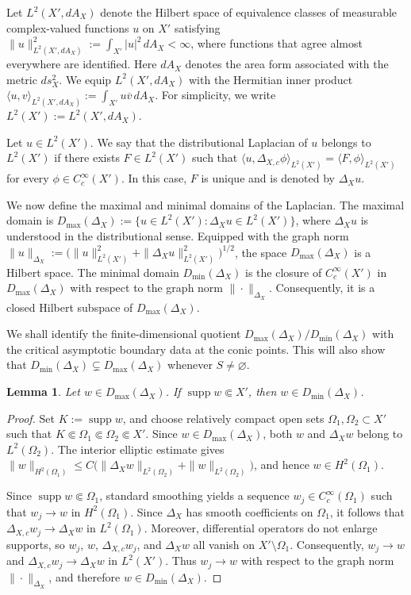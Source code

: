 \documentclass[12pt]{amsart}
\theoremstyle{plain}
\newtheorem{lem}[thm]{Lemma}
\theoremstyle{definition}
\theoremstyle{remark}
\numberwithin{equation}{section} \numberwithin{figure}{section}
\renewcommand*{\to}{\rightarrow}
\begin{document}
Let \(L^2(X',dA_X)\) denote the Hilbert space of equivalence classes of
measurable complex-valued functions \(u\) on \(X'\) satisfying
\(\|u\|_{L^2(X',dA_X)}^2:=\int_{X'}|u|^2\,dA_X<\infty\), where functions
that agree almost everywhere are identified. Here \(dA_X\) denotes the
area form associated with the metric \(ds_X^2\). We equip
\(L^2(X',dA_X)\) with the Hermitian inner product
\(\langle u,v\rangle_{L^2(X',dA_X)}
:=\int_{X'}u\overline{v}\,dA_X\). For simplicity, we write
\(L^2(X'):=L^2(X',dA_X)\).

Let \(u\in L^2(X')\). We say that the distributional Laplacian of \(u\)
belongs to \(L^2(X')\) if there exists \(F\in L^2(X')\) such that
\(\langle u,\Delta_{X,c}\phi\rangle_{L^2(X')}
=\langle F,\phi\rangle_{L^2(X')}\) for every
\(\phi\in C_c^\infty(X')\). In this case, \(F\) is unique and is denoted
by \(\Delta_Xu\).


We now define the maximal and minimal domains of the Laplacian. The maximal
domain is
\(D_{\max}(\Delta_X):=\{u\in L^2(X'):\Delta_Xu\in L^2(X')\}\), where
\(\Delta_Xu\) is understood in the distributional sense. Equipped with the
graph norm
\(\|u\|_{\Delta_X}:=
\bigl(\|u\|_{L^2(X')}^2+\|\Delta_Xu\|_{L^2(X')}^2\bigr)^{1/2}\),
the space \(D_{\max}(\Delta_X)\) is a Hilbert space.
The minimal domain \(D_{\min}(\Delta_X)\) is the closure of
\(C_c^\infty(X')\) in \(D_{\max}(\Delta_X)\) with respect to the graph
norm \(\|\cdot\|_{\Delta_X}\). Consequently, it is a closed Hilbert
subspace of \(D_{\max}(\Delta_X)\).


We shall identify the finite-dimensional quotient
\(D_{\max}(\Delta_X)/D_{\min}(\Delta_X)\) with the critical
asymptotic boundary data at the conic points. This will also show that
\(D_{\min}(\Delta_X)\subsetneq D_{\max}(\Delta_X)\) whenever
\(S\neq\varnothing\).

\begin{lem}\label{lem:away-from-conic}
Let \(w\in D_{\max}(\Delta_X)\). If
\(\operatorname{supp}w\Subset X'\), then
\(w\in D_{\min}(\Delta_X)\).
\end{lem}
\begin{proof}
Set \(K:=\operatorname{supp}w\), and choose relatively compact open sets
\(\Omega_1,\Omega_2\subset X'\) such that
\(K\Subset\Omega_1\Subset\Omega_2\Subset X'\). Since
\(w\in D_{\max}(\Delta_X)\), both \(w\) and \(\Delta_Xw\) belong to
\(L^2(\Omega_2)\). The interior elliptic estimate gives
\(\|w\|_{H^2(\Omega_1)}
\leq C\bigl(\|\Delta_Xw\|_{L^2(\Omega_2)}
+\|w\|_{L^2(\Omega_2)}\bigr)\), and hence
\(w\in H^2(\Omega_1)\).

Since \(\operatorname{supp}w\Subset\Omega_1\), standard smoothing yields
a sequence \(w_j\in C_c^\infty(\Omega_1)\) such that
\(w_j\to w\) in \(H^2(\Omega_1)\). Since \(\Delta_X\) has smooth
coefficients on \(\Omega_1\), it follows that
\(\Delta_{X,c}w_j\to\Delta_Xw\) in \(L^2(\Omega_1)\). Moreover,
differential operators do not enlarge supports, so \(w_j\), \(w\),
\(\Delta_{X,c}w_j\), and \(\Delta_Xw\) all vanish on
\(X'\setminus\Omega_1\). Consequently, \(w_j\to w\) and
\(\Delta_{X,c}w_j\to\Delta_Xw\) in \(L^2(X')\). Thus \(w_j\to w\)
with respect to the graph norm \(\|\cdot\|_{\Delta_X}\), and therefore
\(w\in D_{\min}(\Delta_X)\).
\end{proof}
\end{document}
